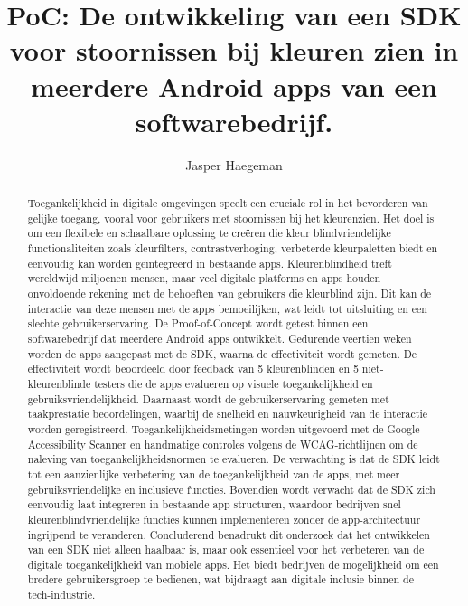 \documentclass{hogent-article}
\title{PoC: De ontwikkeling van een SDK voor stoornissen bij kleuren zien in meerdere Android apps van een softwarebedrijf.}
\author{Jasper Haegeman}
\begin{document}
\begin{abstract}
 Toegankelijkheid in digitale omgevingen speelt een cruciale rol in het bevorderen van gelijke 
 toegang, vooral voor gebruikers met stoornissen bij het kleurenzien. Het doel is om een flexibele 
 en schaalbare oplossing te creëren die kleur blindvriendelijke functionaliteiten zoals kleurfilters,
 contrastverhoging, verbeterde kleurpaletten biedt en eenvoudig kan worden geïntegreerd in 
 bestaande apps. Kleurenblindheid treft wereldwijd miljoenen mensen, maar veel digitale platforms
 en apps houden onvoldoende rekening met de behoeften van gebruikers die kleurblind zijn. 
 Dit kan de interactie van deze mensen met de apps bemoeilijken, wat leidt tot uitsluiting en 
 een slechte gebruikerservaring. De Proof-of-Concept wordt getest binnen een softwarebedrijf dat 
 meerdere Android apps ontwikkelt. Gedurende veertien weken worden de apps aangepast met de SDK, 
 waarna de effectiviteit wordt gemeten. De effectiviteit wordt beoordeeld door feedback van 
 5 kleurenblinden en 5 niet-kleurenblinde testers die de apps evalueren op visuele toegankelijkheid 
 en gebruiksvriendelijkheid. Daarnaast wordt de gebruikerservaring gemeten met taakprestatie 
 beoordelingen, waarbij de snelheid en nauwkeurigheid van de interactie worden geregistreerd. 
 Toegankelijkheidsmetingen worden uitgevoerd met de Google Accessibility Scanner en handmatige 
 controles volgens de WCAG-richtlijnen om de naleving van toegankelijkheidsnormen te evalueren. 
 De verwachting is dat de SDK leidt tot een aanzienlijke verbetering van de toegankelijkheid van 
 de apps, met meer gebruiksvriendelijke en inclusieve functies. Bovendien wordt verwacht dat de 
 SDK zich eenvoudig laat integreren in bestaande app structuren, waardoor bedrijven snel 
 kleurenblindvriendelijke functies kunnen implementeren zonder de app-architectuur ingrijpend 
 te veranderen. Concluderend benadrukt dit onderzoek dat het ontwikkelen van een SDK niet alleen 
 haalbaar is, maar ook essentieel voor het verbeteren van de digitale toegankelijkheid van 
 mobiele apps. Het biedt bedrijven de mogelijkheid om een bredere gebruikersgroep te bedienen, 
 wat bijdraagt aan digitale inclusie binnen de tech-industrie.
\end{abstract}

\tableofcontents



\printbibliography[heading=bibintoc]
\end{document}
